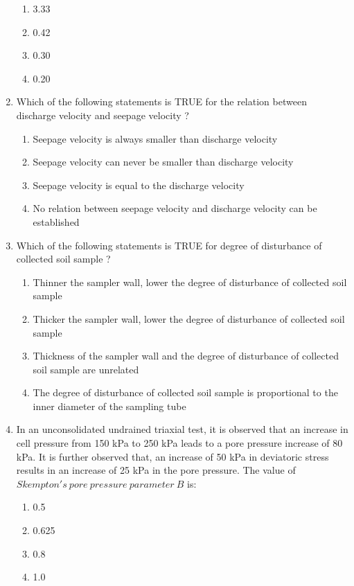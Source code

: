 \documentclass[journal]{IEEEtran}
\begin{document}
\begin{enumerate}
\begin{enumerate}
    \item 3.33
    \item 0.42
    \item 0.30
    \item 0.20 \\
\end{enumerate}
\item Which of the following statements is TRUE for the relation between discharge velocity and seepage velocity ?
\begin{enumerate}
    \item Seepage velocity is always smaller than discharge velocity
    \item Seepage velocity can never be smaller than discharge velocity
    \item Seepage velocity is equal to the discharge velocity
    \item No relation between seepage velocity and discharge velocity can be established \\
\end{enumerate}
\item Which of the following statements is TRUE for degree of disturbance of collected soil sample ?
\begin{enumerate}
    \item Thinner the sampler wall, lower the degree of disturbance of collected soil sample
    \item Thicker the sampler wall, lower the degree of disturbance of collected soil sample
    \item Thickness of the sampler wall and the degree of disturbance of collected soil sample are unrelated
    \item The degree of disturbance of collected soil sample is proportional to the inner diameter of the sampling tube \\
\end{enumerate}
\item In an unconsolidated undrained triaxial test, it is observed that an increase in cell pressure from 150 kPa to 250 kPa leads to a pore pressure increase of 80 kPa. It is further observed that, an increase of 50 kPa in deviatoric stress results in an increase of 25 kPa in the pore pressure. The value of $Skempton's\ pore\ pressure\ parameter\ B$ is:
  \begin{enumerate}
   \item 0.5
   \item 0.625
   \item 0.8
   \item 1.0 \\

\end{enumerate}
\end{enumerate}
\end{document}
